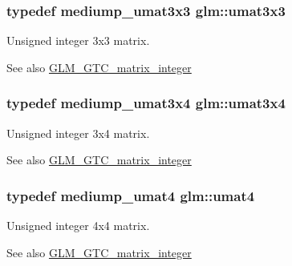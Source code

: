\subsubsection[{umat3x3}]{\setlength{\rightskip}{0pt plus 5cm}typedef mediump\+\_\+umat3x3 {\bf glm\+::umat3x3}}\label{group__gtc__matrix__integer_gab80b6501ba1b2c40119a0f2d256f4c97}
Unsigned integer 3x3 matrix. \begin{DoxySeeAlso}{See also}
\hyperlink{group__gtc__matrix__integer}{G\+L\+M\+\_\+\+G\+T\+C\+\_\+matrix\+\_\+integer} 
\end{DoxySeeAlso}
\hypertarget{group__gtc__matrix__integer_ga5410857d098a989a30b4017100bc2ff7}{}
\subsubsection[{umat3x4}]{\setlength{\rightskip}{0pt plus 5cm}typedef mediump\+\_\+umat3x4 {\bf glm\+::umat3x4}}\label{group__gtc__matrix__integer_ga5410857d098a989a30b4017100bc2ff7}
Unsigned integer 3x4 matrix. \begin{DoxySeeAlso}{See also}
\hyperlink{group__gtc__matrix__integer}{G\+L\+M\+\_\+\+G\+T\+C\+\_\+matrix\+\_\+integer} 
\end{DoxySeeAlso}
\hypertarget{group__gtc__matrix__integer_ga7ae562000d8a8d193e9f93cf51e2e113}{}
\subsubsection[{umat4}]{\setlength{\rightskip}{0pt plus 5cm}typedef mediump\+\_\+umat4 {\bf glm\+::umat4}}\label{group__gtc__matrix__integer_ga7ae562000d8a8d193e9f93cf51e2e113}
Unsigned integer 4x4 matrix. \begin{DoxySeeAlso}{See also}
\hyperlink{group__gtc__matrix__integer}{G\+L\+M\+\_\+\+G\+T\+C\+\_\+matrix\+\_\+integer} 
\end{DoxySeeAlso}
\hypertarget{group__gtc__matrix__integer_ga13e8392218e9b6e1b7f194a21b5c88bf}{}
